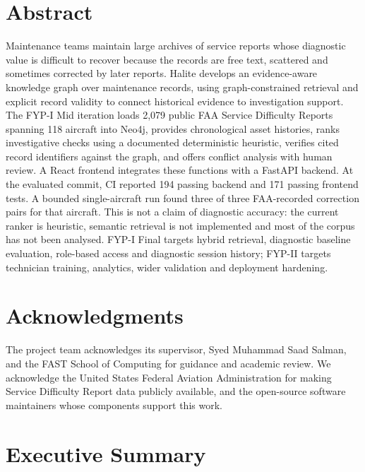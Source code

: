 \clearpage
\chapter*{Abstract}

Maintenance teams maintain large archives of service reports whose diagnostic value is difficult to recover because the records are free text, scattered and sometimes corrected by later reports. Halite develops an evidence-aware knowledge graph over maintenance records, using graph-constrained retrieval and explicit record validity to connect historical evidence to investigation support. The FYP-I Mid iteration loads 2,079 public FAA Service Difficulty Reports spanning 118 aircraft into Neo4j, provides chronological asset histories, ranks investigative checks using a documented deterministic heuristic, verifies cited record identifiers against the graph, and offers conflict analysis with human review. A React frontend integrates these functions with a FastAPI backend. At the evaluated commit, CI reported 194 passing backend and 171 passing frontend tests. A bounded single-aircraft run found three of three FAA-recorded correction pairs for that aircraft. This is not a claim of diagnostic accuracy: the current ranker is heuristic, semantic retrieval is not implemented and most of the corpus has not been analysed. FYP-I Final targets hybrid retrieval, diagnostic baseline evaluation, role-based access and diagnostic session history; FYP-II targets technician training, analytics, wider validation and deployment hardening.

\clearpage
\chapter*{Acknowledgments}

The project team acknowledges its supervisor, Syed Muhammad Saad Salman, and the FAST School of Computing for guidance and academic review. We acknowledge the United States Federal Aviation Administration for making Service Difficulty Report data publicly available, and the open-source software maintainers whose components support this work.

\clearpage
\chapter*{Executive Summary}

